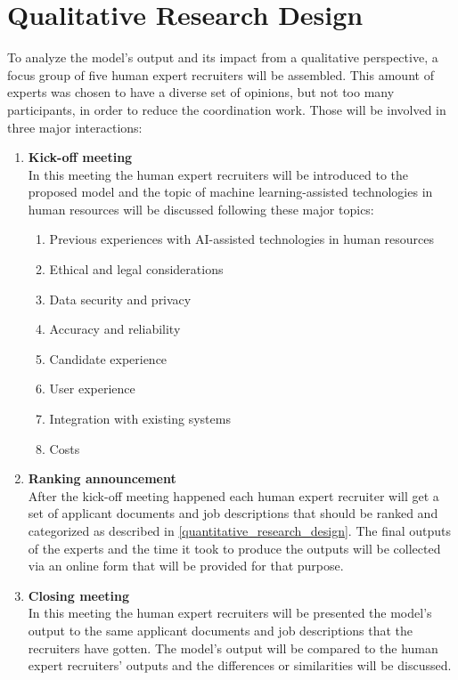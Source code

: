 \documentclass[draft,final]{thesisclass} %
\begin{document}
\section{Qualitative Research Design} \label{qualitative_research_design}
To analyze the model's output and its impact from a qualitative perspective, a focus group of five human expert recruiters will be assembled.
This amount of experts was chosen to have a diverse set of opinions, but not too many participants, in order to reduce the coordination work.
Those will be involved in three major interactions:
\begin{enumerate}
    \item \textbf{Kick-off meeting}\\
    In this meeting the human expert recruiters will be introduced to the proposed model and the topic of machine learning-assisted technologies in human resources will be discussed following these major topics:
    \begin{enumerate}
        \item Previous experiences with AI-assisted technologies in human resources
        \item Ethical and legal considerations
        \item Data security and privacy
        \item Accuracy and reliability
        \item Candidate experience
        \item User experience
        \item Integration with existing systems
        \item Costs
    \end{enumerate} 
    \item \textbf{Ranking announcement}\\
    After the kick-off meeting happened each human expert recruiter will get a set of applicant documents and job descriptions that should be ranked and categorized as described in \ref{quantitative_research_design}.
    The final outputs of the experts and the time it took to produce the outputs will be collected via an online form that will be provided for that purpose.
    \item \textbf{Closing meeting}\\
    In this meeting the human expert recruiters will be presented the model's output to the same applicant documents and job descriptions that the recruiters have gotten.
    The model's output will be compared to the human expert recruiters' outputs and the differences or similarities will be discussed.

\end{enumerate}
\end{document}
